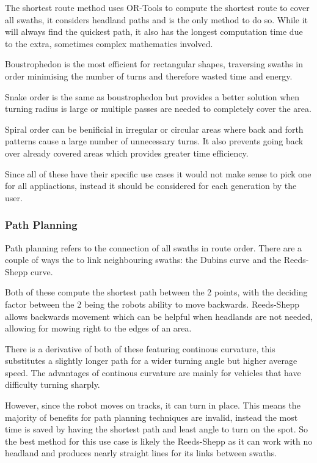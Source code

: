 \documentclass[final]{cmpreport_02}
\begin{document}
The shortest route method uses OR-Tools \citep{ortools} to compute the shortest route to cover all swaths, it considers headland paths and is the only method to do so.
While it will always find the quickest path, it also has the longest computation time due to the extra, sometimes complex mathematics involved.

Boustrophedon is the most efficient for rectangular shapes, traversing swaths in order minimising the number of turns and therefore wasted time and energy.

Snake order is the same as boustrophedon but provides a better solution when turning radius is large or multiple passes are needed to completely cover the area.


Spiral order can be benificial in irregular or circular areas where back and forth patterns cause a large number of unnecessary turns.
It also prevents going back over already covered areas which provides greater time efficiency.

Since all of these have their specific use cases it would not make sense to pick one for all appliactions, instead it should be considered for each generation by the user.

\subsubsection{Path Planning}
Path planning refers to the connection of all swaths in route order.
There are a couple of ways the to link neighbouring swaths: the Dubins curve and the Reeds-Shepp curve.


Both of these compute the shortest path between the 2 points, with the deciding factor between the 2 being the robots ability to move backwards.
Reeds-Shepp allows backwards movement which can be helpful when headlands are not needed, allowing for mowing right to the edges of an area.

There is a derivative of both of these featuring continous curvature, this substitutes a slightly longer path for a wider turning angle but higher average speed.
The advantages of continous curvature are mainly for vehicles that have difficulty turning sharply.

However, since the robot moves on tracks, it can turn in place.
This means the majority of benefits for path planning techniques are invalid, instead the most time is saved by having the shortest path and least angle to turn on the spot.
So the best method for this use case is likely the Reeds-Shepp as it can work with no headland and produces nearly straight lines for its links between swaths.
\end{document}
